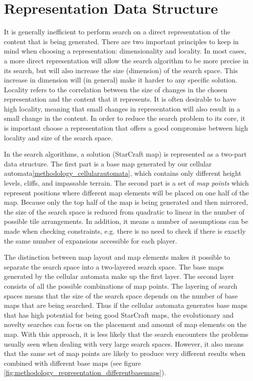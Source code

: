 \section{Representation Data Structure}
\label{methodology_representation}
It is generally inefficient to perform search on a direct representation of the content that is being generated. There are two important principles to keep in mind when choosing a representation: dimensionality and locality. In most cases, a more direct representation will allow the search algorithm to be more precise in its search, but will also increase the size (dimension) of the search space. This increase in dimension will (in general) make it harder to any specific solution. Locality refers to the correlation between the size of changes in the chosen representation and the content that it represents. It is often desirable to have high locality, meaning that small changes in representation will also result in a small change in the content\cite{togelius2015searchbased}. In order to reduce the search problem to its core, it is important choose a representation that offers a good compromise between high locality and size of the search space. 

In the search algorithms, a solution (StarCraft map) is represented as a two-part data structure. The first part is a base map generated by our cellular automata\ref{methodology_cellularautomata}, which contains only different height levels, cliffs, and impassable terrain. The second part is a set of \textit{map points} which represent positions where different map elements will be placed on one half of the map. Because only the top half of the map is being generated and then mirrored, the size of the search space is reduced from quadratic to linear in the number of possible tile arrangements. In addition, it means a number of assumptions can be made when checking constraints, e.g. there is no need to check if there is exactly the same number of expansions accessible for each player.

The distinction between map layout and map elements makes it possible to separate the search space into a two-layered search space. The base maps generated by the cellular automata make up the first layer. The second layer consists of all the possible combinations of map points. The layering of search spaces means that the size of the search space depends on the number of base maps that are being searched. Thus if the cellular automata generates base maps that has high potential for being good StarCraft maps, the evolutionary and novelty searches can focus on the placement and amount of map elements on the map. With this approach, it is less likely that the search encounters the problems usually seen when dealing with very large search spaces. However, it also means that the same set of map points are likely to produce very different results when combined with different base maps (see figure \ref{fig:methodology_representation_differentbasemaps}).

